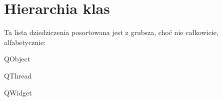 \section{Hierarchia klas}
Ta lista dziedziczenia posortowana jest z grubsza, choć nie całkowicie, alfabetycznie\-:\begin{DoxyCompactList}
\item Q\-Object\begin{DoxyCompactList}
\item {}
\end{DoxyCompactList}
\item Q\-Thread\begin{DoxyCompactList}
\item {}
\end{DoxyCompactList}
\item Q\-Widget\begin{DoxyCompactList}
\item {}
\end{DoxyCompactList}
\end{DoxyCompactList}
